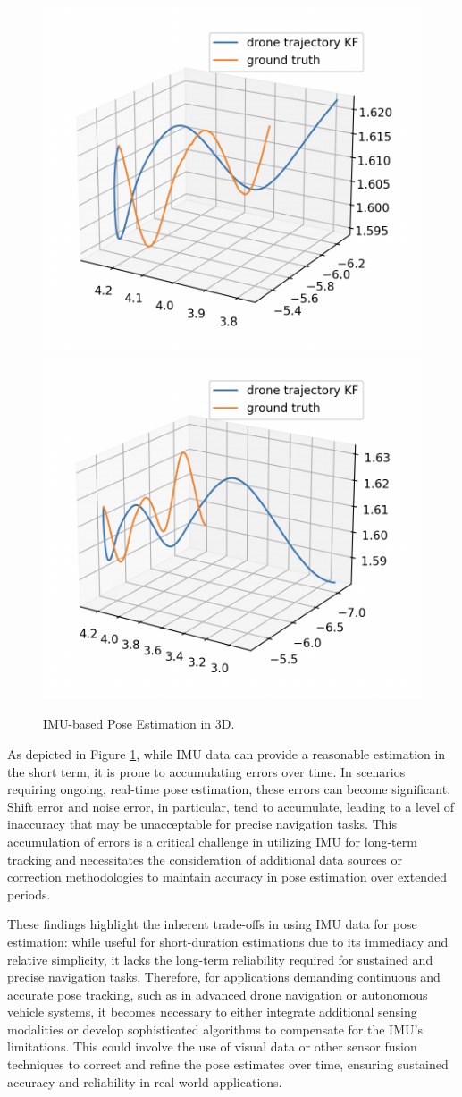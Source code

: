 \begin{figure}[H]
    \centering
    \includegraphics[width=.5\linewidth]{Pictures/pose_est/pose_est_IMU_3d.png}\hfill
    \includegraphics[width=.5\linewidth]{Pictures/pose_est/shift_error.png}
    \caption{IMU-based Pose Estimation in 3D.}
    \label{fig:pos_est2}
\end{figure}
As depicted in Figure \ref{fig:pos_est2}, while IMU data can provide a reasonable estimation in the short term, it is prone to accumulating errors over time. In scenarios requiring ongoing, real-time pose estimation, these errors can become significant. Shift error and noise error, in particular, tend to accumulate, leading to a level of inaccuracy that may be unacceptable for precise navigation tasks. This accumulation of errors is a critical challenge in utilizing IMU for long-term tracking and necessitates the consideration of additional data sources or correction methodologies to maintain accuracy in pose estimation over extended periods.

These findings highlight the inherent trade-offs in using IMU data for pose estimation: while useful for short-duration estimations due to its immediacy and relative simplicity, it lacks the long-term reliability required for sustained and precise navigation tasks. Therefore, for applications demanding continuous and accurate pose tracking, such as in advanced drone navigation or autonomous vehicle systems, it becomes necessary to either integrate additional sensing modalities or develop sophisticated algorithms to compensate for the IMU's limitations. This could involve the use of visual data or other sensor fusion techniques to correct and refine the pose estimates over time, ensuring sustained accuracy and reliability in real-world applications.



